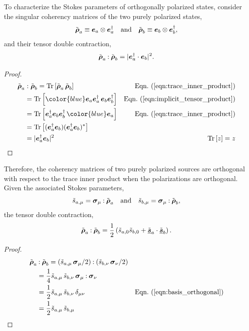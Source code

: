 To characterize the Stokes parameters of orthogonally polarized states,
consider the singular coherency matrices of the two purely polarized states,
%
$$\tilde{\mbox{\boldmath $\rho$}}_a \equiv \mbox{\boldmath $e$}_a \otimes \mbox{\boldmath $e$}_a^\dagger \quad \text{and} \quad
\tilde{\mbox{\boldmath $\rho$}}_b \equiv \mbox{\boldmath $e$}_b \otimes \mbox{\boldmath $e$}_b^\dagger,$$
%
and their tensor double contraction,
%
\begin{equation}
\label{eqn:coherency_projection_field}
{\tilde{\mbox{\boldmath $\rho$}}_a}\mathbin{:}{\tilde{\mbox{\boldmath $\rho$}}_b} = | \mbox{\boldmath $e$}_a^\dagger \cdot \mbox{\boldmath $e$}_b |^2.
\end{equation}
%
\begin{proof}
%
\begin{align*}
{\tilde{\cohM{\rho}}_a}&:{\tilde{\cohM{\rho}}_b}
= \tr{\tilde{\cohM{\rho}}_a \, \tilde{\cohM{\rho}}_b}
	& \peqn{trace_inner_product} \\
&= \tr{ {\color{blue}\Jcol{e}_a} \Jcol{e}_a^\dagger \, \Jcol{e}_b \Jcol{e}_b^\dagger }
	& \peqn{implicit_tensor_product} \\
&= \tr{ \Jcol{e}_a^\dagger \Jcol{e}_b \Jcol{e}_b^\dagger \, {\color{blue}\Jcol{e}_a} }
	& \peqn{trace_inner_product} \\
&= \tr{ (\Jcol{e}_a^\dagger \Jcol{e}_b)  (\Jcol{e}_a^\dagger \Jcol{e}_b)^* } \\
&= | \Jcol{e}_a^\dagger \Jcol{e}_b |^2
	& \tr{z} = z
\end{align*}
\end{proof}
%
\noindent
Therefore, the coherency matrices of two purely polarized sources are orthogonal
with respect to the trace inner product  when the polarizations are orthogonal.
%
Given the associated Stokes parameters, 
%
$$\tilde{s}_{a,\mu} = \mbox{\boldmath $\sigma$}_{\mu} \mathbin{:} \tilde{\mbox{\boldmath $\rho$}}_a
\quad \text{and} \quad
\tilde{s}_{b,\mu} = \mbox{\boldmath $\sigma$}_{\mu} \mathbin{:} \tilde{\mbox{\boldmath $\rho$}}_b,$$
%
the tensor double contraction,
%
\begin{equation}
\label{eqn:coherency_projection_Stokes}
{\tilde{\mbox{\boldmath $\rho$}}_a}\mathbin{:}{\tilde{\mbox{\boldmath $\rho$}}_b} = \frac{1}{2} \left( \tilde{s}_{a,0} \tilde{s}_{b,0} + \tilde{\underline{\mbox{\boldmath $s$}}}_a \cdot \tilde{\underline{\mbox{\boldmath $s$}}}_b \right).
\end{equation}
%
\begin{proof}
%
\begin{align*}
{\tilde{\cohM{\rho}}_a}&\dcbo{\tilde{\cohM{\rho}}_b} 
 =  ( \tilde{s}_{a,\mu} \, \pauli{\mu} / 2 ) \dcbo (\tilde{s}_{b,\nu} \, \pauli{\nu} / 2)  \\
&= \frac{1}{4}  \tilde{s}_{a,\mu} \, \tilde{s}_{b,\nu} \, \pauli{\mu}  \dcbo \pauli{\nu}  \\
&= \frac{1}{2} \tilde{s}_{a,\mu} \, \tilde{s}_{b,\nu} \, \delta_{\mu\nu}
   & \peqn{basis_orthogonal}  \\
&= \frac{1}{2} \tilde{s}_{a,\mu} \, \tilde{s}_{b,\mu}
\end{align*}
\end{proof}

